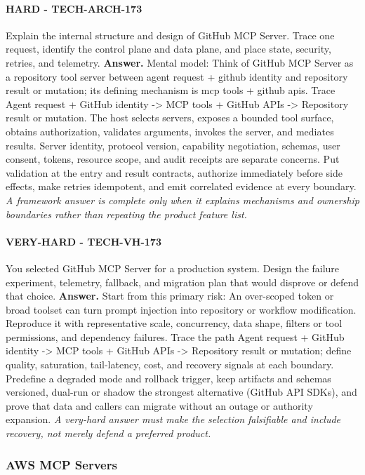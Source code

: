 \paragraph{HARD - TECH-ARCH-173} Explain the internal structure and design of GitHub MCP Server. Trace one request, identify the control plane and data plane, and place state, security, retries, and telemetry.
\textbf{Answer.} Mental model: Think of GitHub MCP Server as a repository tool server between agent request + github identity and repository result or mutation; its defining mechanism is mcp tools + github apis. Trace Agent request + GitHub identity -> MCP tools + GitHub APIs -> Repository result or mutation. The host selects servers, exposes a bounded tool surface, obtains authorization, validates arguments, invokes the server, and mediates results. Server identity, protocol version, capability negotiation, schemas, user consent, tokens, resource scope, and audit receipts are separate concerns. Put validation at the entry and result contracts, authorize immediately before side effects, make retries idempotent, and emit correlated evidence at every boundary.
\textit{A framework answer is complete only when it explains mechanisms and ownership boundaries rather than repeating the product feature list.}
\paragraph{VERY-HARD - TECH-VH-173} You selected GitHub MCP Server for a production system. Design the failure experiment, telemetry, fallback, and migration plan that would disprove or defend that choice.
\textbf{Answer.} Start from this primary risk: An over-scoped token or broad toolset can turn prompt injection into repository or workflow modification. Reproduce it with representative scale, concurrency, data shape, filters or tool permissions, and dependency failures. Trace the path Agent request + GitHub identity -> MCP tools + GitHub APIs -> Repository result or mutation; define quality, saturation, tail-latency, cost, and recovery signals at each boundary. Predefine a degraded mode and rollback trigger, keep artifacts and schemas versioned, dual-run or shadow the strongest alternative (GitHub API SDKs), and prove that data and callers can migrate without an outage or authority expansion.
\textit{A very-hard answer must make the selection falsifiable and include recovery, not merely defend a preferred product.}
\subsubsection*{AWS MCP Servers}
